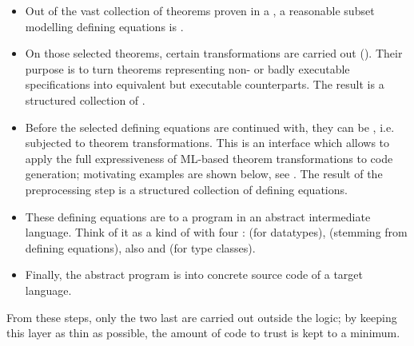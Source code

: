 \begin{isabellebody}
\begin{isamarkuptext}
  \begin{itemize}

    \item Out of the vast collection of theorems proven in a
      , a reasonable subset modelling
      defining equations is .

    \item On those selected theorems, certain
      transformations are carried out
      ().  Their purpose is to turn theorems
      representing non- or badly executable
      specifications into equivalent but executable counterparts.
      The result is a structured collection of .

    \item Before the selected defining equations are continued with,
      they can be , i.e. subjected to theorem
      transformations.  This  is an interface which
      allows to apply
      the full expressiveness of ML-based theorem transformations
      to code generation;  motivating examples are shown below, see
      .
      The result of the preprocessing step is a structured collection
      of defining equations.

    \item These defining equations are  to a program
      in an abstract intermediate language.  Think of it as a kind
      of  with four : 
      (for datatypes),  (stemming from defining equations),
      also  and  (for type classes).

    \item Finally, the abstract program is  into concrete
      source code of a target language.

  \end{itemize}

  \noindent From these steps, only the two last are carried out outside the logic;  by
  keeping this layer as thin as possible, the amount of code to trust is
  kept to a minimum.%
\end{isamarkuptext}%
\isamarkuptrue%
%
\isadelimtheory
%
\endisadelimtheory
%
\isatagtheory
{}\isamarkupfalse%
%
\endisatagtheory
{\isafoldtheory}%
%
\isadelimtheory
%
\endisadelimtheory
\isanewline
\end{isabellebody}%
